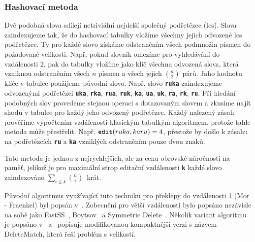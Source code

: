 \documentclass[11pt,letterpaper,oneside,openright]{book}
\newcommand{\bftt}[1]{\texttt{\textbf{#1}}}
\begin{document}
\subsubsection{Hashovací metoda} \label{sec:hash_fuzzy}
Dvě podobná slova sdílejí netriviální nejdelší společný podřetězec (lcs). Slova
zaindexujeme tak, že do hashovací tabulky vložíme všechny jejich odvozené lcs
podřetězce. Ty pro každé slovo získáme odstraněním všech podmnožin písmen do
požadované velikosti. Např. pokud slovník omezíme pro vyhledávání do
vzdálenosti 2, pak do tabulky vložíme jako klíč všechna odvozená slova, která
vzniknou odstraněním všech $n$ písmen a všech jejich ${n \choose 2}$ párů. Jaho
hodnotu klíče v tabulce použijeme původní slovo. Např. slovo \bftt{ruka}
zaindexujeme odvozenými podřetězci \bftt{uka}, \bftt{rka}, \bftt{rua},
\bftt{ruk}, \bftt{ka}, \bftt{ua}, \bftt{uk}, \bftt{ra}, \bftt{rk}, \bftt{ru}.
Při hledání podobných slov provedeme stejnou operaci s dotazovaným slovem a
zkusíme najít shodu v tabulce pro každý jeho odvozený podřetězec. Každý
nalezený zásah prověříme vypočtením vzdálenosti klasickým tabulkým algoritmem,
protože tahle metoda může přestřelit. Např. $\bftt{edit}(ruka, karu) = 4$,
přestože by došlo k zásahu na podřetězcích \bftt{ru} a \bftt{ka} vzniklých
odstraněním pouze dvou znaků.

Tato metoda je jednou z nejrychlejších, ale za cenu obrovské náročnosti na
paměť, jelikož je pro maximální strop editační vzdálenosti \bftt{k} každé slovo
zaindexováno $\sum_{i \leq k} {n \choose i}$~krát.

Původní algoritmus  využívající tuto techniku pro překlepy do vzdálenosti 1
(Mor - Fraenkel) byl popsán v~\cite{Mor:1982:HCM:358728.358752}. Zobecnění pro
větší vzdálenosti bylo popsáno nezávisle na sobě jako FastSS~\cite{FastSS},
Boytsov~\cite{Boytsov:2011:IMA:1963190.1963191} a Symmetric
Delete~\cite{Faroo_symmetric_delete}. Několik variant algoritmu je popsáno
v~\cite{FastSS} a~\cite{Bast:2013:EFS:2457465.2457470} popisuje modifikovanou
kompaktnější verzi s názvem DeleteMatch, která řeší problém s velikostí.
\end{document}
